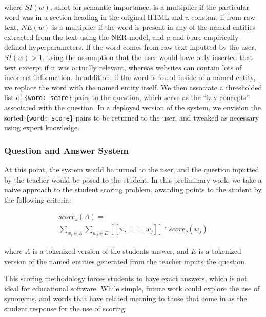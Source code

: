 \documentclass[11pt,a4paper]{article}
\begin{document}
where $SI(w)$, short for semantic importance, is a multiplier if the particular word was in a section heading in the original HTML and a constant if from raw text, $NE(w)$ is a multiplier if the word is present in any of the named entities extracted from the text using the NER model, and $a$ and $b$ are empirically defined hyperparameters. If the word comes from raw text inputted by the user, $SI(w)>1$, using the assumption that the user would have only inserted that text excerpt if it was actually relevant, whereas websites can contain lots of incorrect information. In addition, if the word is found inside of a named entity, we replace the word with the named entity itself. We then associate a thresholded list of \texttt{\{word: score\}} pairs to the question, which serve as the “key concepts” associated with the question. In a deployed version of the system, we envision the sorted \texttt{\{word: score\}} pairs to be returned to the user, and tweaked as necessary using expert knowledge.
\subsubsection{Question and Answer System}
At this point, the system would be turned to the user, and the question inputted by the teacher would be posed to the student. In this preliminary work, we take a naive approach to the student scoring problem, awarding points to the student by the following criteria:

\begin{center}
    \begin{align}
        score_s(A) =\\
        \sum_{w_i \in A} \sum_{w_j \in E}[[w_i==w_j]]* score_q(w_j)
	\end{align}
\end{center}

where $A$ is a tokenized version of the students answer, and $E$ is a tokenized version of the named entities generated from the teacher inputs the question.

This scoring methodology forces students to have exact answers, which is not ideal for educational software. While simple, future work could explore the use of synonyms, and words that have related meaning to those that come in as the student response for the use of scoring.
\end{document}
